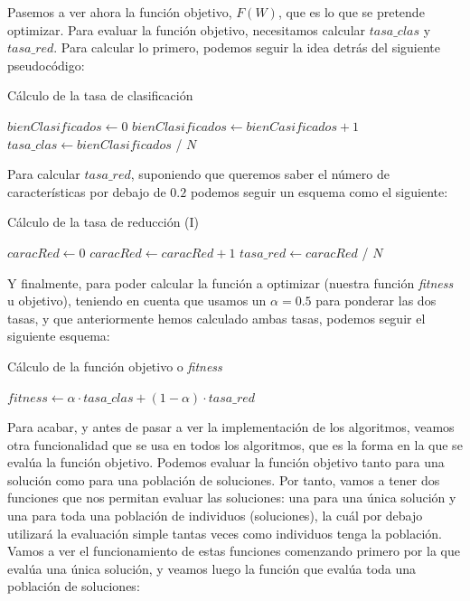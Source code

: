 \documentclass[11pt,a4paper]{article}
\begin{document}
Pasemos a ver ahora la función objetivo, $F(W)$, que es lo que se pretende optimizar. Para evaluar la función objetivo,
necesitamos calcular $tasa\_clas$ y $tasa\_red$. Para calcular lo primero, podemos seguir la idea detrás del siguiente
pseudocódigo:

\begin{algorithm}[H]
\caption{Cálculo de la tasa de clasificación}
\begin{algorithmic}[1]
\State $bienClasificados \gets 0$
		\State $bienClasificados \gets bienCasificados + 1$
	\EndIf
\EndFor
\State $tasa\_clas \gets bienClasificados$ / $N$
\State {}
\EndFunction
\end{algorithmic}
\end{algorithm}

Para calcular $tasa\_red$, suponiendo que queremos saber el número de características por debajo de $0.2$ podemos seguir un
esquema como el siguiente:

\begin{algorithm}[H]
\caption{Cálculo de la tasa de reducción (I)}
\begin{algorithmic}[1]
\State $caracRed \gets 0$
		\State $caracRed \gets caracRed + 1$
	\EndIf
\EndFor
\State $tasa\_red \gets caracRed$ / $N$
\State {}
\EndFunction
\end{algorithmic}
\end{algorithm}

Y finalmente, para poder calcular la función a optimizar (nuestra función \textit{fitness} u objetivo), teniendo en cuenta que
usamos un $\alpha = 0.5$ para ponderar las dos tasas, y que anteriormente hemos calculado ambas tasas, podemos seguir el
siguiente esquema:

\begin{algorithm}[H]
\caption{Cálculo de la función objetivo o \textit{fitness}}
\begin{algorithmic}[1]
\State $fitness \gets \alpha \cdot tasa\_clas + (1 - \alpha) \cdot tasa\_red$
\State {}
\EndFunction
\end{algorithmic}
\end{algorithm}

Para acabar, y antes de pasar a ver la implementación de los algoritmos, veamos otra funcionalidad que se usa en todos los
algoritmos, que es la forma en la que se evalúa la función objetivo. Podemos evaluar la función objetivo tanto para una solución
como para una población de soluciones. Por tanto, vamos a tener dos funciones que nos permitan evaluar las soluciones: una para
una única solución y una para toda una población de individuos (soluciones), la cuál por debajo utilizará la evaluación simple
tantas veces como individuos tenga la población. Vamos a ver el funcionamiento de estas funciones comenzando primero por
la que evalúa una única solución, y veamos luego la función que evalúa toda una población de soluciones:
\end{document}
